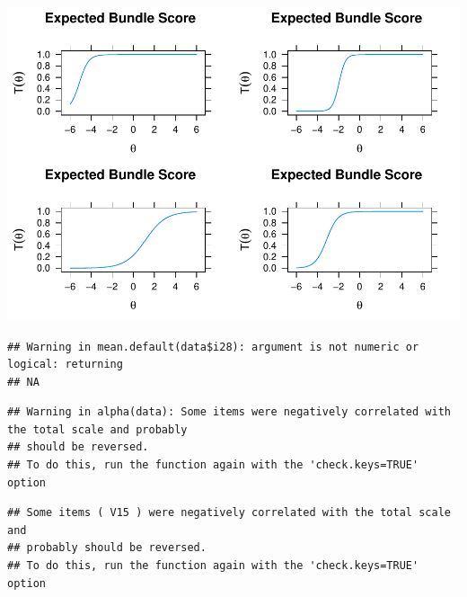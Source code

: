 \documentclass[
  english,
  man]{apa6}
\begin{document}
\includegraphics{ICC_project_files/figure-latex/unnamed-chunk-4-3.pdf}

\begin{verbatim}
## Warning in mean.default(data$i28): argument is not numeric or logical: returning
## NA
\end{verbatim}

\begin{verbatim}
## Warning in alpha(data): Some items were negatively correlated with the total scale and probably 
## should be reversed.  
## To do this, run the function again with the 'check.keys=TRUE' option
\end{verbatim}

\begin{verbatim}
## Some items ( V15 ) were negatively correlated with the total scale and 
## probably should be reversed.  
## To do this, run the function again with the 'check.keys=TRUE' option
\end{verbatim}
\end{document}
